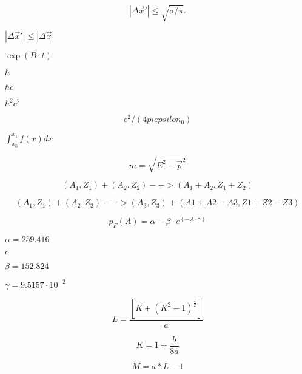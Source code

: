 \documentclass{article}
\begin{document}
\[ |\Delta\vec{x}'| \leq \sqrt{\sigma/\pi}.\]
\pagebreak

$|\Delta\vec{x}'|\leq|\Delta\vec{x}|$
\pagebreak

$\exp(B\cdot t)$
\pagebreak

$\hbar$
\pagebreak

$\hbar c$
\pagebreak

$\hbar^2 c^2$
\pagebreak

\[ e^2/(4 pi epsilon_0) \]
\pagebreak

$\int_{x_0}^{x_1} f(x) dx$
\pagebreak

\[ m = \sqrt{E^2 - {\vec p}^2}\]
\pagebreak

\[ (A_1,Z_1) + (A_2, Z_2) --> (A_1+A_2,Z_1+Z_2) \]
\pagebreak

\[ (A_1,Z_1) + (A_2, Z_2) --> (A_3,Z_3) + (A1+A2-A3,Z1+Z2-Z3) \]
\pagebreak

\[ p_F(A)=\alpha-\beta\cdot e^{(-A\cdot\gamma)} \]
\pagebreak

$\alpha=259.416$
\pagebreak

$c$
\pagebreak

$\beta=152.824$
\pagebreak

$\gamma=9.5157\cdot10^{-2}$
\pagebreak

\[ L = \frac{[K + (K^2 - 1)^\frac{1}{2}]}{a} \]
\pagebreak

\[ K = 1 + \frac{b}{8a} \]
\pagebreak

\[ M = a*L-1 \]
\pagebreak
\end{document}
